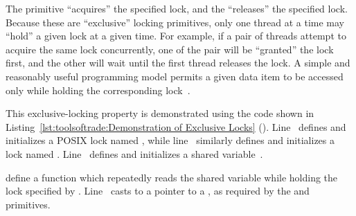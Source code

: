 The  primitive ``acquires'' the specified lock,
and the  ``releases'' the specified lock.
Because these are ``exclusive'' locking primitives,
only one thread at a time may ``hold'' a given lock at a given time.
For example, if a pair of threads attempt to acquire the same lock
concurrently, one of the pair will be ``granted'' the lock first, and
the other will wait until the first thread releases the lock.
A simple and reasonably useful programming model permits a given data item
to be accessed only while holding the corresponding
lock~\cite{Hoare74}.

\QuickQuizEnd

\begin{listing}[tbp]

\caption{Demonstration of Exclusive Locks}
\label{lst:toolsoftrade:Demonstration of Exclusive Locks}
\end{listing}

\begin{fcvref}
This exclusive-locking property is demonstrated using the code shown in
Listing~\ref{lst:toolsoftrade:Demonstration of Exclusive Locks}
().
Line~ defines and initializes a POSIX lock named , while
line~ similarly defines and initializes a lock named .
Line~ defines and initializes a shared variable~.
\end{fcvref}

\begin{fcvref}
 define a function  which repeatedly
reads the shared variable  while holding
the lock specified by .
Line~ casts  to a pointer to a , as
required by the  and 
primitives.
\end{fcvref}

